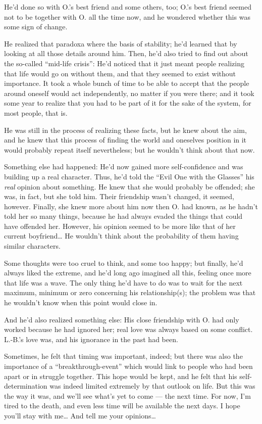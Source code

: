 He'd done so with O.'s best friend and some others, too; O.'s best friend seemed not to be together with O. all the time now, and he wondered whether this was some sign of change.

He realized that paradoxa where the basis of stability; he'd learned that by looking at all those details around him. Then, he'd also tried to find out about the so-called \enquote{mid-life crisis}: He'd noticed that it just meant people realizing that life would go on without them, and that they seemed to exist without importance. It took a whole bunch of time to be able to accept that the people around oneself would act independently, no matter if you were there; and it took some year to realize that you had to be part of it for the sake of the system, for most people, that is.

He was still in the process of realizing these facts, but he knew about the aim, and he knew that this process of finding the world and oneselves position in it would probably repeat itself nevertheless; but he wouldn't think about that now.

Something else had happened: He'd now gained more self-confidence and was building up a real character. Thus, he'd told the \enquote{Evil One with the Glasses} his \emph{real} opinion about something. He knew that she would probably be offended; she was, in fact, but she told him. Their friendship wasn't changed, it seemed, however. Finally, she knew more about him now then O. had known, as he hadn't told her so many things, because he had always evaded the things that could have offended her. However, his opinion seemed to be more like that of her current boyfriend\ldots
He wouldn't think about the probability of them having similar characters.

Some thoughts were too cruel to think, and some too happy; but finally, he'd always liked the extreme, and he'd long ago imagined all this, feeling once more that life was a wave. The only thing he'd have to do was to wait for the next maximum, minimum or zero concerning his relationship(s); the problem was that he wouldn't know when this point would close in.

And he'd also realized something else: His close friendship with O. had only worked because he had ignored her; real love was always based on some conflict. 
L.-B.'s love was, and his ignorance in the past had been.

Sometimes, he felt that timing was important, indeed; but there was also the importance of a \enquote{breakthrough-event} which would link to people who had been apart or in struggle together. 
This hope would be kept, and he felt that his self-determination was indeed limited extremely by that outlook on life. But this was the way it was, and we'll see what's yet to come --- the next time. 
For now, I'm tired to the death, and even less time will be available the next days. 
I hope you'll stay with me\ldots
And tell me your opinions\ldots

